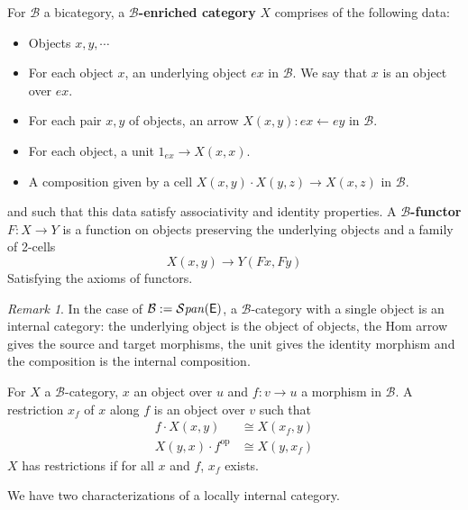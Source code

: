 \documentclass[10pt,a4paper]{article}
\newcommand{\ca}[1]{\mathcal{#1}}
\newcommand{\cat}[1]{\textcat{#1}}
\newcommand{\textcat}[1]{{\normalfont\textsf{#1}}}
\newcommand{\from}{\leftarrow}
\newcommand{\op}{\mathrm{op}}
\newcommand{\simeqq}{\cong}
\DeclareMathOperator{\bSpan}{\ca{S}\mathit{pan}}
\theoremstyle{plain}
\theoremstyle{definition}
\theoremstyle{remark}
\newtheorem{remark}[theorem]{Remark}
\begin{document}
\begin{definition}
    \index{$\ca B$-category}
    For $\ca{B}$ a bicategory, a \textbf{$\ca{B}$-enriched category} $X$ comprises of the following data:
    \begin{itemize}
        \item Objects $x, y, \cdots$
        \item For each object $x$, an underlying object $ex$ in $\ca B$.  We say that $x$ is an object over $ex$.
        \item For each pair $x, y$ of objects, an arrow $X(x, y) : ex \from ey$ in $\ca B$.
        \item For each object, a unit $1_{ex} \to X(x, x)$.
        \item A composition given by a cell $X(x, y) \cdot X(y, z) \to X(x, z)$ in $\ca B$.
    \end{itemize}
    and such that this data satisfy associativity and identity properties. A \textbf{$\ca{B}$-functor} $F : X \to Y$ is a function on objects preserving the underlying objects and a family of 2-cells
    $$X(x, y) \to Y(Fx, Fy)$$
    Satisfying the axioms of functors.
\end{definition}

\begin{remark}
    In the case of $\ca{B} := \bSpan(\cat{E})$, a $\ca{B}$-category with a single object is an internal category: the underlying object is the object of objects, the Hom arrow gives the source and target morphisms, the unit gives the identity morphism and the composition is the internal composition.
\end{remark}

\begin{definition}
    \label{def:intcat_res}
    For $X$ a $\ca B$-category, $x$ an object over $u$ and $f : v \to u$ a morphism in $\ca B$. A restriction $x_f$ of $x$ along $f$ is an object over $v$ such that
    \begin{align*}
        f \cdot X(x, y) &\simeqq X(x_f, y)\\
        X(y, x) \cdot f^\op &\simeqq X(y, x_f)
    \end{align*}
    $X$ has restrictions if for all $x$ and $f$, $x_f$ exists.
\end{definition}

We have two characterizations of a locally internal category.
\end{document}
